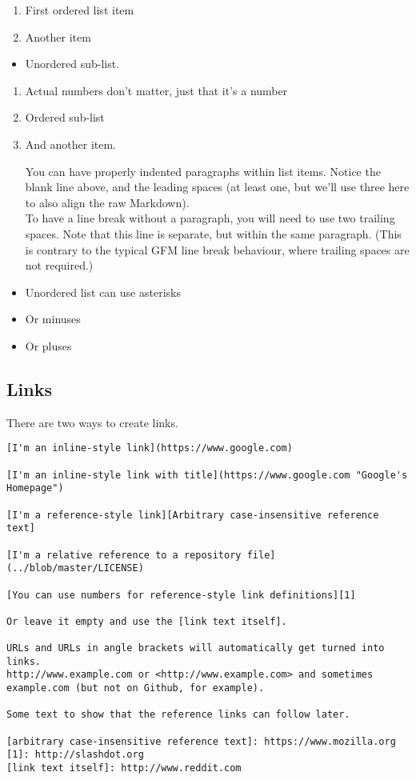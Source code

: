 \documentclass[a4paper, 11pt]{gfm}
\begin{document}
\begin{enumerate}
  \item First ordered list item
  \item Another item
\end{enumerate}

\begin{itemize}
  \item Unordered sub-list.
\end{itemize}

\begin{enumerate}
  \item Actual numbers don't matter, just that it's a number
  \item Ordered sub-list
  \item And another item.
	
	You can have properly indented paragraphs within list items. Notice the blank line above, and the leading spaces (at least one, but we'll use three here to also align the raw Markdown).\\
	
	To have a line break without a paragraph, you will need to use two trailing spaces.
Note that this line is separate, but within the same paragraph.
(This is contrary to the typical GFM line break behaviour, where trailing spaces are not required.)
\end{enumerate}

\begin{itemize}
	\item Unordered list can use asterisks
	\item Or minuses
	\item Or pluses
\end{itemize}

\subsection{Links}

There are two ways to create links.

\begin{lstlisting}
[I'm an inline-style link](https://www.google.com)

[I'm an inline-style link with title](https://www.google.com "Google's Homepage")

[I'm a reference-style link][Arbitrary case-insensitive reference text]

[I'm a relative reference to a repository file](../blob/master/LICENSE)

[You can use numbers for reference-style link definitions][1]

Or leave it empty and use the [link text itself].

URLs and URLs in angle brackets will automatically get turned into links. 
http://www.example.com or <http://www.example.com> and sometimes 
example.com (but not on Github, for example).

Some text to show that the reference links can follow later.

[arbitrary case-insensitive reference text]: https://www.mozilla.org
[1]: http://slashdot.org
[link text itself]: http://www.reddit.com
\end{lstlisting}
\end{document}

